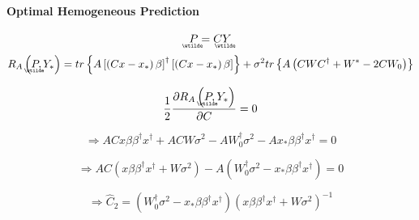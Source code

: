 \documentclass{article}
\begin{document}
\paragraph{Optimal Hemogeneous Prediction}

\begin{equation*}
\underaccent{\wtilde}{P}%
=C%
\underaccent{\wtilde}{Y}%
\end{equation*}%
\begin{equation*}
R_{A}\left( 
\underaccent{\wtilde}{P}%
,Y_{\ast }\right) =tr\left\{ A\left[ \left( Cx-x_{\ast }\right) \beta \right]
^{\dagger }\left[ \left( Cx-x_{\ast }\right) \beta \right] \right\} +\sigma
^{2}tr\left\{ A\left( CWC^{\dagger }+W^{\ast }-2CW_{0}\right) \right\} 
\end{equation*}

\begin{equation*}
\frac{1}{2}\frac{\partial R_{A}\left( 
\underaccent{\wtilde}{P}%
,Y_{\ast }\right) }{\partial C}=0
\end{equation*}

\begin{equation*}
\Rightarrow ACx\beta \beta ^{\dagger }x^{\dagger }+ACW\sigma
^{2}-AW_{0}^{\dagger }\sigma ^{2}-Ax_{\ast }\beta \beta ^{\dagger
}x^{\dagger }=0
\end{equation*}

\begin{equation*}
\Rightarrow AC\left( x\beta \beta ^{\dagger }x^{\dagger }+W\sigma
^{2}\right) -A\left( W_{0}^{\dagger }\sigma ^{2}-x_{\ast }\beta \beta
^{\dagger }x^{\dagger }\right) =0
\end{equation*}

\begin{equation*}
\Rightarrow \hat{C}_{2}=\left( W_{0}^{\dagger }\sigma ^{2}-x_{\ast }\beta
\beta ^{\dagger }x^{\dagger }\right) \left( x\beta \beta ^{\dagger
}x^{\dagger }+W\sigma ^{2}\right) ^{-1}
\end{equation*}
\end{document}
